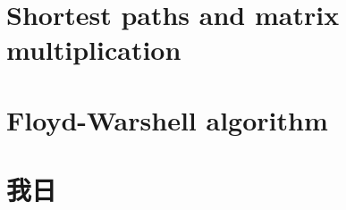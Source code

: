 \documentclass[a4paper, 10pt]{ctexart} %
\begin{document}
\tableofcontents
\section{Shortest paths and matrix multiplication}
\section{Floyd-Warshell algorithm}
\section{我日}
\end{document}
